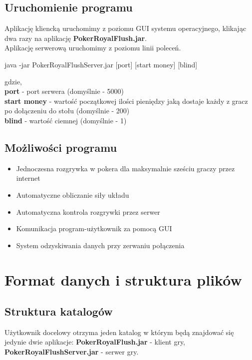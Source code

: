 \documentclass{article}
\begin{document}
    \subsection{Uruchomienie programu}
        Aplikację kliencką uruchomimy z poziomu GUI systemu operacyjnego, klikając dwa razy na aplikację \textbf{PokerRoyalFlush.jar}.
        \\
        Aplikację serwerową uruchomimy z poziomu linii poleceń.
        \begin{center}
            java -jar PokerRoyalFlushServer.jar [port] [start money] [blind]
        \end{center}
        gdzie,\\
        \textbf{port} - port serwera (domyślnie - 5000)\\
        \textbf{start money} - wartość początkowej ilości pieniędzy jaką dostaje każdy z gracz po dołączeniu do stołu (domyślnie - 200)\\
        \textbf{blind} - wartość ciemnej (domyślnie - 1)
    
    \subsection{Możliwości programu}
        \begin{itemize}
            \item Jednoczesna rozgrywka w pokera dla maksymalnie sześciu graczy przez internet
            \item Automatyczne obliczanie siły układu
            \item Automatyczna kontrola rozgrywki przez serwer
            \item Komunikacja program-użytkownik za pomocą GUI
            \item System odzyskiwania danych przy zerwaniu połączenia
        \end{itemize}

\section{Format danych i struktura plików}
    \subsection{Struktura katalogów}
        Użytkownik docelowy otrzyma jeden katalog w którym będą znajdować się jedynie dwie aplikacje: \textbf{PokerRoyalFlush.jar} - klient gry, \textbf{PokerRoyalFlushServer.jar} - serwer gry.
    
\end{document}
